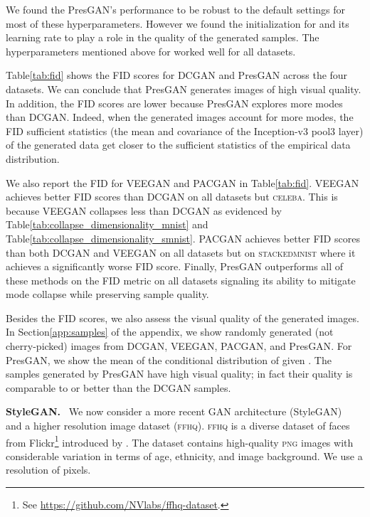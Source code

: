 \documentclass[11pt]{article}
\DeclareRobustCommand{\parhead}[1]{\textbf{#1}~}
\begin{document}
We found the Pres\gls{GAN}'s performance to be robust to the default settings for most of these hyperparameters. However we found the initialization for  and its learning rate to play a role in the quality of the generated samples. The hyperparameters mentioned above for  worked well for all datasets. 

Table\nobreakspace \ref {tab:fid} shows the \gls{FID} scores for \gls{DCGAN} and Pres\gls{GAN} across the four datasets.  
We can conclude that Pres\gls{GAN} generates images of high visual quality. In addition, the \gls{FID} scores are lower because Pres\gls{GAN} explores more modes than \gls{DCGAN}. Indeed, when the generated images account for more modes, the \gls{FID} sufficient statistics (the mean and covariance of the Inception-v3 pool3 layer) of the generated data get closer to the sufficient statistics of the empirical data distribution.

We also report the \gls{FID} for \acrshort{VEEGAN} and  \acrshort{PACGAN} in Table\nobreakspace \ref {tab:fid}.
\acrshort{VEEGAN} achieves better \gls{FID} scores than \acrshort{DCGAN} on all datasets but \textsc{celeba}. This is because \acrshort{VEEGAN} collapses less than \acrshort{DCGAN} as evidenced by Table\nobreakspace \ref {tab:collapse_dimensionality_mnist} and Table\nobreakspace \ref {tab:collapse_dimensionality_smnist}.  \acrshort{PACGAN} achieves better \gls{FID} scores than both \acrshort{DCGAN} and \acrshort{VEEGAN} on all datasets but on \textsc{stackedmnist} where it achieves a significantly worse \gls{FID} score. Finally, Pres\gls{GAN} outperforms all of these methods on the \gls{FID} metric on all datasets signaling its ability to mitigate mode collapse while preserving sample quality.

Besides the \gls{FID} scores, we also assess the visual quality of the generated images. In Section\nobreakspace \ref {app:samples} of the appendix, we show randomly generated (not cherry-picked) images from \gls{DCGAN},  \acrshort{VEEGAN}, \acrshort{PACGAN}, and Pres\gls{GAN}.  
For Pres\gls{GAN}, we show the mean of the conditional distribution of  given . The samples generated by Pres\gls{GAN} have high visual quality; in fact their quality is comparable to or better than the \gls{DCGAN} samples.

\parhead{Style\gls{GAN}.} We now consider a more recent \gls{GAN} architecture (Style\gls{GAN})~\citep{karras2019style} and a higher resolution image dataset (\textsc{ffhq}). 
\textsc{ffhq} is a diverse dataset of faces from Flickr\footnote{See \url{https://github.com/NVlabs/ffhq-dataset}.} introduced by \citet{karras2019style}. The dataset contains  high-quality \textsc{png} images with considerable variation in terms of age, ethnicity, and image background. We use a resolution of  pixels. 
\end{document}
